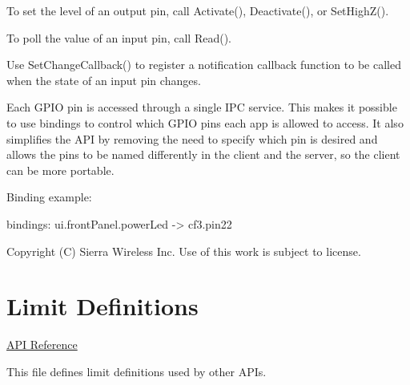 To set the level of an output pin, call Activate(), Deactivate(), or Set\+High\+Z().

To poll the value of an input pin, call Read().

Use Set\+Change\+Callback() to register a notification callback function to be called when the state of an input pin changes.

Each G\+P\+I\+O pin is accessed through a single I\+P\+C service. This makes it possible to use bindings to control which G\+P\+I\+O pins each app is allowed to access. It also simplifies the A\+P\+I by removing the need to specify which pin is desired and allows the pins to be named differently in the client and the server, so the client can be more portable.

Binding example\+:

\begin{DoxyVerb}bindings:
{
    ui.frontPanel.powerLed -> cf3.pin22
}
\end{DoxyVerb}






Copyright (C) Sierra Wireless Inc. Use of this work is subject to license. \hypertarget{c_limit}{}\section{Limit Definitions}\label{c_limit}
\hyperlink{le__limit__interface_8h}{A\+P\+I Reference}

This file defines limit definitions used by other A\+P\+Is.





